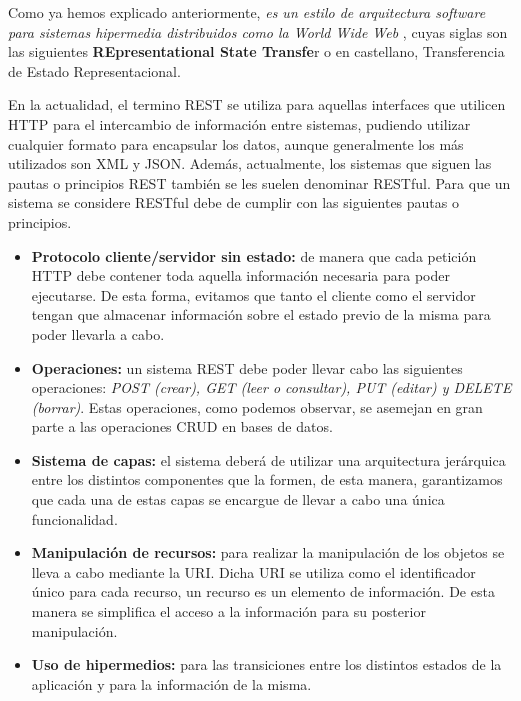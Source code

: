 Como ya hemos explicado anteriormente, \emph{es un estilo de arquitectura software para sistemas hipermedia distribuidos como la World Wide Web} \cite{wiki:rest2}, cuyas siglas son las siguientes \textbf{REpresentational State Transfe}r o en castellano, Transferencia de Estado Representacional.

En la actualidad, el termino REST se utiliza para aquellas interfaces que utilicen HTTP para el intercambio de información entre sistemas, pudiendo utilizar cualquier formato para encapsular los datos, aunque generalmente los más utilizados son XML y JSON. Además, actualmente, los sistemas que siguen las pautas o principios REST también se les suelen denominar RESTful.
Para que un sistema se considere RESTful debe de cumplir con las siguientes pautas o principios. \cite{wiki:rest}

\begin{itemize}

	\item \textbf{Protocolo cliente/servidor sin estado:} de manera que cada petición HTTP debe contener toda aquella información necesaria para poder ejecutarse. De esta forma,  evitamos que tanto el cliente como el servidor tengan que almacenar información sobre el estado previo de la misma para poder llevarla a cabo.
	
	\item \textbf{Operaciones:} un sistema REST debe poder llevar cabo las siguientes operaciones: \emph{POST (crear), GET (leer o consultar), PUT (editar) y DELETE (borrar)}. Estas operaciones, como podemos observar, se asemejan en gran parte a las operaciones CRUD en bases de datos.
	
	\item \textbf{Sistema de capas:} el sistema deberá de utilizar una arquitectura jerárquica entre los distintos componentes que la formen, de esta manera, garantizamos que cada una de estas capas se encargue de llevar a cabo una única funcionalidad.
	
	\item \textbf{Manipulación de recursos:} para realizar la manipulación de los objetos se lleva a cabo mediante la URI. Dicha URI se utiliza como el identificador único para cada recurso, un recurso es un elemento de información. De esta manera se simplifica el acceso a la información para su posterior manipulación.
	
	\item \textbf{Uso de hipermedios:} para las transiciones entre los distintos estados de la aplicación y para la información de la misma.
	
\end{itemize}
 
